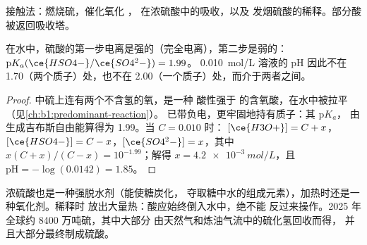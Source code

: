 \begin{omfigure}

{\small 接触法：燃烧硫，催化氧化
， 在浓硫酸中的吸收，以及
发烟硫酸的稀释。部分酸被返回吸收塔。}
\end{omfigure}

\begin{proposition}[硫酸的强度]\label{prop:b1:p-block-16-18:sulfuric-strength}
在水中，硫酸的第一步电离是强的（完全电离），第二步是弱的：
$\mathrm{p}K_a(\ce{HSO4-}/\ce{SO4^2-}) = 1.99$。
\qty{0.010}{mol/L} 溶液的 pH 因此不在 1.70（两个质子）处，也不在
2.00（一个质子）处，而介于两者之间。
\end{proposition}

\begin{proof}
 中硫上连有两个不含氢的氧，是一种
酸性强于  的含氧酸，在水中被拉平（见\cref{ch:b1:predominant-reaction}）。
 已带负电，更牢固地持有质子：其 $\mathrm{p}K_a$，
由生成吉布斯自由能算得为 1.99。当 $C = 0.010$ 时：
$[\ce{H3O+}] = C + x$，$[\ce{HSO4-}] = C - x$，$[\ce{SO4^2-}] = x$，其中
$x(C + x)/(C - x) = 10^{-1.99}$；解得 $x = \qty{4.2e-3}{mol/L}$，且
$\mathrm{pH} = -\log(0.0142) = 1.85$。
\end{proof}

浓硫酸也是一种强脱水剂（能使糖炭化，
夺取糖中水的组成元素），加热时还是一种氧化剂。稀释时
放出大量热：酸应始终倒入水中，绝不能
反过来操作。2025 年全球约 8400 万吨硫，其中大部分
由天然气和炼油气流中的硫化氢回收而得，
并且大部分最终制成硫酸。

